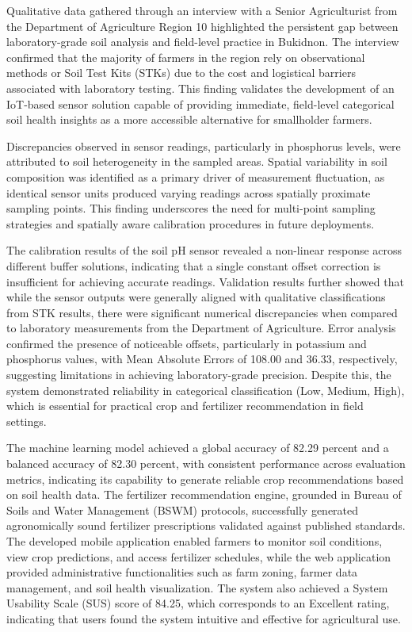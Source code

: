 {Qualitative data gathered through an interview with a Senior Agriculturist from the Department of Agriculture Region 10 highlighted the persistent gap between laboratory-grade soil analysis and field-level practice in Bukidnon. The interview confirmed that the majority of farmers in the region rely on observational methods or Soil Test Kits (STKs) due to the cost and logistical barriers associated with laboratory testing. This finding validates the development of an IoT-based sensor solution capable of providing immediate, field-level categorical soil health insights as a more accessible alternative for smallholder farmers.

Discrepancies observed in sensor readings, particularly in phosphorus levels, were attributed to soil heterogeneity in the sampled areas. Spatial variability in soil composition was identified as a primary driver of measurement fluctuation, as identical sensor units produced varying readings across spatially proximate sampling points. This finding underscores the need for multi-point sampling strategies and spatially aware calibration procedures in future deployments.

The calibration results of the soil pH sensor revealed a non-linear response across different buffer solutions, indicating that a single constant offset correction is insufficient for achieving accurate readings. Validation results further showed that while the sensor outputs were generally aligned with qualitative classifications from STK results, there were significant numerical discrepancies when compared to laboratory measurements from the Department of Agriculture. Error analysis confirmed the presence of noticeable offsets, particularly in potassium and phosphorus values, with Mean Absolute Errors of 108.00 and 36.33, respectively, suggesting limitations in achieving laboratory-grade precision.  Despite this, the system demonstrated reliability in categorical classification (Low, Medium, High), which is essential for practical crop and fertilizer recommendation in field settings.

The machine learning model achieved a global accuracy of 82.29 percent and a balanced accuracy of 82.30 percent, with consistent performance across evaluation metrics, indicating its capability to generate reliable crop recommendations based on soil health data. The fertilizer recommendation engine, grounded in Bureau of Soils and Water Management (BSWM) protocols, successfully generated agronomically sound fertilizer prescriptions validated against published standards. The developed mobile application enabled farmers to monitor soil conditions, view crop predictions, and access fertilizer schedules, while the web application provided administrative functionalities such as farm zoning, farmer data management, and soil health visualization. The system also achieved a System Usability Scale (SUS) score of 84.25, which corresponds to an Excellent rating, indicating that users found the system intuitive and effective for agricultural use.

}

